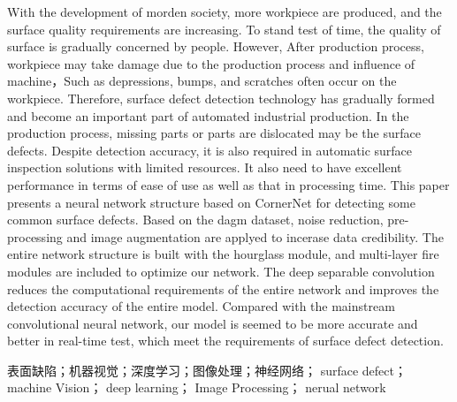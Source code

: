 With the development of morden society, more workpiece are produced, and the surface quality requirements are increasing. To stand test of time, the quality of surface is gradually concerned by people. However, After production process, workpiece may take damage due to the production process and influence of machine，Such as depressions, bumps, and scratches often occur on the workpiece. Therefore, surface defect detection technology has gradually formed and become an important part of automated industrial production. In the production process, missing parts or parts are dislocated may be the surface defects. Despite detection accuracy, it is also required in automatic surface inspection solutions with limited resources. It also need to have excellent performance in terms of ease of use as well as that in processing time. This paper presents a neural network structure based on CornerNet for detecting some common surface defects. Based on the dagm dataset, noise reduction, pre-processing and image augmentation are applyed to incerase data credibility. The entire network structure is built with the hourglass module, and multi-layer fire modules are included to optimize our network. The deep separable convolution reduces the computational requirements of the entire network and improves the detection accuracy of the entire model. Compared with the mainstream convolutional neural network, our model is seemed to be more accurate and better in real-time test, which meet the requirements of surface defect
detection.

表⾯缺陷；机器视觉；深度学习；图像处理；神经⽹络； surface defect； machine Vision； deep learning； Image Processing； nerual network